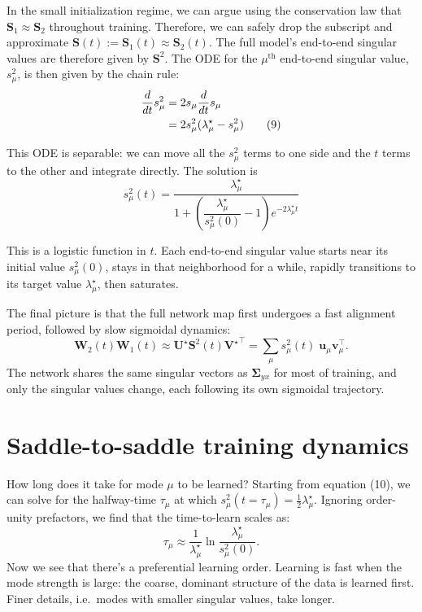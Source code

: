 \documentclass[12pt]{article}
\newcommand{\vu}{\mathbf{u}}
\newcommand{\vv}{\mathbf{v}}
\newcommand{\mW}{\mathbf{W}}
\newcommand{\mU}{\mathbf{U}}
\newcommand{\mV}{\mathbf{V}}
\newcommand{\mS}{\mathbf{S}}
\newcommand{\mSigma}{\boldsymbol{\Sigma}}
\begin{document}
In the small initialization regime, we can argue using the conservation law that $\mS_1 \approx \mS_2$ throughout training. Therefore, we can safely drop the subscript and approximate $\mS(t) := \mS_1(t) \approx \mS_2(t)$. The full model's end-to-end singular values are therefore given by $\mS^2$. The ODE for the $\mu^\mathrm{th}$ end-to-end singular value, $s_\mu^2$, is then given by the chain rule:
\begin{align}
    \frac{d}{dt}s_\mu^2 &= 2s_\mu \frac{d}{dt} s_\mu \notag \\
    &= 2 s_\mu^2 (\lambda^\star_\mu - s_\mu^2) \tag{9}
\end{align}

This ODE is separable: we can move all the $s_\mu^2$ terms to one side and the $t$ terms to the other and integrate directly. The solution is
\begin{equation}
    \boxed{s^2_\mu(t) = \frac{\lambda^\star_\mu}{1 + \left(\dfrac{\lambda^\star_\mu}{s^2_\mu(0)} - 1\right) e^{-2 \lambda^\star_\mu t}}} \tag{10}
\end{equation}

This is a logistic function in $t$. Each end-to-end singular value starts near its initial value $s^2_\mu(0)$, stays in that neighborhood for a while, rapidly transitions to its target value $\lambda_\mu^\star$, then saturates.

The final picture is that the full network map first undergoes a fast alignment period, followed by slow sigmoidal dynamics:
\begin{equation}
    \mW_2(t) \mW_1(t) \approx \mU^\star \mS^2(t) {\mV^\star}^\top = \sum_\mu s^2_\mu(t) \; \vu_\mu \vv_\mu^\top.
\end{equation}
The network shares the same singular vectors as $\mSigma_{yx}$ for most of training, and only the singular values change, each following its own sigmoidal trajectory.

\section{Saddle-to-saddle training dynamics}

How long does it take for mode $\mu$ to be learned? Starting from equation (10), we can solve for the halfway-time $\tau_\mu$ at which $s^2_\mu(t=\tau_\mu)=\frac{1}{2}\lambda^\star_\mu$. Ignoring order-unity prefactors, we find that the time-to-learn scales as:
\begin{equation}
    \tau_\mu \approx \frac{1}{\lambda^\star_\mu} \ln \frac{\lambda^\star_\mu}{s^2_\mu(0)}.
\end{equation}
Now we see that there's a preferential learning order. Learning is fast when the mode strength is large: the coarse, dominant structure of the data is learned first. Finer details, i.e.\ modes with smaller singular values, take longer.
\end{document}

